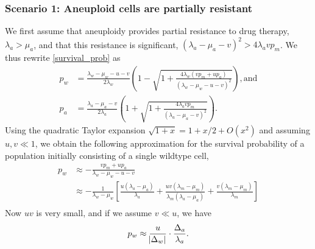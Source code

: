 \documentclass[12pt]{extarticle}
\begin{document}
\begin{appendices}
\subsubsection*{Scenario 1: Aneuploid cells are partially resistant} 

We first assume that aneuploidy provides partial resistance to drug therapy, $\lambda_a>\mu_a$, and that this resistance is significant, $\left(\lambda_a-\mu_a-v\right)^2 > 4\lambda_a v p_m$.
We thus rewrite \cref{survival_prob} as
\begin{align*}
p_w&=\frac{\lambda_w-\mu_w-u-v}{2\lambda_w}\left(1-\sqrt{1+\frac{4\lambda_w\left(vp_m+up_a\right)}{\left(\lambda_w-\mu_w-u-v\right)^2}}\right) ,
\text{and} \\
p_a&=\frac{\lambda_a-\mu_a-v}{2\lambda_a}\left(1+\sqrt{1+\frac{4\lambda_avp_m}{\left(\lambda_a-\mu_a-v\right)^2}}\right) . 
\end{align*}
Using the quadratic Taylor expansion $\sqrt{1+x}=1+x/2+O(x^2)$ and assuming $u,v \ll 1$,
we obtain the following approximation for the survival probability of a population initially consisting of a single wildtype cell,
\begin{align}\label{survprobwapprox1}
p_w 
&\approx -\frac{vp_m+up_a}{\lambda_w-\mu_w-u-v}\\
\nonumber
&\approx-\frac{1}{\lambda_w-\mu_w}\left[\frac{u\left(\lambda_a-\mu_a\right)}{\lambda_a}+\frac{uv\left(\lambda_m-\mu_m\right)}{\lambda_m\left(\lambda_a-\mu_a\right)}+\frac{v\left(\lambda_m-\mu_m\right)}{\lambda_m}\right]\\
\end{align}
Now $u v$ is very small, and if we assume $v \ll u$, we have
\begin{equation}
p_w \approx \frac{u}{\abs{\Delta_w}} \cdot \frac{\Delta_a}{\lambda_a} .
\end{equation}


\end{appendices}
\end{document}
